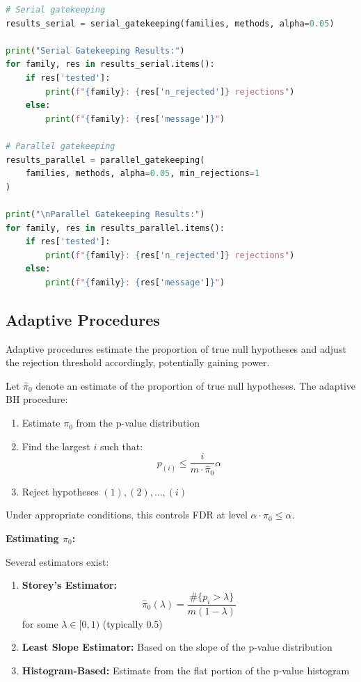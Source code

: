 \begin{lstlisting}[language=Python, caption={Gatekeeping Procedure Implementation}]
# Serial gatekeeping
results_serial = serial_gatekeeping(families, methods, alpha=0.05)

print("Serial Gatekeeping Results:")
for family, res in results_serial.items():
    if res['tested']:
        print(f"{family}: {res['n_rejected']} rejections")
    else:
        print(f"{family}: {res['message']}")

# Parallel gatekeeping
results_parallel = parallel_gatekeeping(
    families, methods, alpha=0.05, min_rejections=1
)

print("\nParallel Gatekeeping Results:")
for family, res in results_parallel.items():
    if res['tested']:
        print(f"{family}: {res['n_rejected']} rejections")
    else:
        print(f"{family}: {res['message']}")
\end{lstlisting}

\subsection{Adaptive Procedures}

Adaptive procedures estimate the proportion of true null hypotheses and adjust the rejection threshold accordingly, potentially gaining power.

\begin{definition}
Let $\hat{\pi}_0$ denote an estimate of the proportion of true null hypotheses. The adaptive BH procedure:
\begin{enumerate}
    \item Estimate $\pi_0$ from the p-value distribution
    \item Find the largest $i$ such that:
    \begin{equation}
    p_{(i)} \leq \frac{i}{m \cdot \hat{\pi}_0} \alpha
    \end{equation}
    \item Reject hypotheses $(1), (2), \ldots, (i)$
\end{enumerate}

Under appropriate conditions, this controls FDR at level $\alpha \cdot \pi_0 \leq \alpha$.
\end{definition}

\textbf{Estimating $\pi_0$:}

Several estimators exist:
\begin{enumerate}
    \item \textbf{Storey's Estimator:}
    \begin{equation}
    \hat{\pi}_0(\lambda) = \frac{\#\{p_i > \lambda\}}{m(1-\lambda)}
    \end{equation}
    for some $\lambda \in [0, 1)$ (typically 0.5)

    \item \textbf{Least Slope Estimator:} Based on the slope of the p-value distribution

    \item \textbf{Histogram-Based:} Estimate from the flat portion of the p-value histogram
\end{enumerate}

